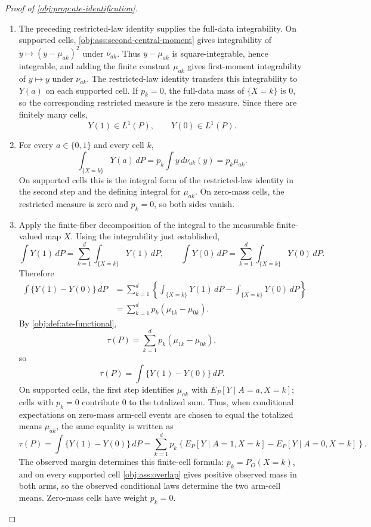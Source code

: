 \begin{proof}[Proof of \cref{obj:prop:ate-identification}]
\begin{enumerate}
\item
The preceding restricted-law identity supplies the full-data integrability.  On supported cells, \cref{obj:ass:second-central-moment} gives integrability of \(y\mapsto (y-\mu_{ak})^2\) under \(\nu_{ak}\).  Thus \(y-\mu_{ak}\) is square-integrable, hence integrable, and adding the finite constant \(\mu_{ak}\) gives first-moment integrability of \(y\mapsto y\) under \(\nu_{ak}\).  The restricted-law identity transfers this integrability to \(Y(a)\) on each supported cell.  If \(p_k=0\), the full-data mass of \(\{X=k\}\) is \(0\), so the corresponding restricted measure is the zero measure.  Since there are finitely many cells,
\[
Y(1)\in L^1(P),\qquad Y(0)\in L^1(P).
\]

\item
For every \(a\in\{0,1\}\) and every cell \(k\),
\[
\int_{\{X=k\}}Y(a)\,dP
=
p_k\int y\,d\nu_{ak}(y)
=
p_k\mu_{ak}.
\]
On supported cells this is the integral form of the restricted-law identity in the second step and the defining integral for \(\mu_{ak}\).  On zero-mass cells, the restricted measure is zero and \(p_k=0\), so both sides vanish. %

\item
Apply the finite-fiber decomposition of the integral to the measurable finite-valued map \(X\).  Using the integrability just established,
\[
\int Y(1)\,dP
=
\sum_{k=1}^{d}\int_{\{X=k\}}Y(1)\,dP,
\qquad
\int Y(0)\,dP
=
\sum_{k=1}^{d}\int_{\{X=k\}}Y(0)\,dP.
\]
Therefore
\[
\begin{aligned}
\int\{Y(1)-Y(0)\}\,dP
&=
\sum_{k=1}^{d}
\left\{
\int_{\{X=k\}}Y(1)\,dP
-
\int_{\{X=k\}}Y(0)\,dP
\right\}\\
&=
\sum_{k=1}^{d}p_k(\mu_{1k}-\mu_{0k}).
\end{aligned}
\]
By \cref{obj:def:ate-functional},
\[
\tau(P)=\sum_{k=1}^{d}p_k(\mu_{1k}-\mu_{0k}),
\]
so
\[
\tau(P)
=
\int\{Y(1)-Y(0)\}\,dP.
\]
On supported cells, the first step identifies \(\mu_{ak}\) with \(E_P[Y\mid A=a,X=k]\); cells with \(p_k=0\) contribute \(0\) to the totalized sum.  Thus, when conditional expectations on zero-mass arm-cell events are chosen to equal the totalized means \(\mu_{ak}\), the same equality is written as
\[
\tau(P)
=
\int\{Y(1)-Y(0)\}\,dP
=
\sum_{k=1}^{d}p_k
\left\{
E_P[Y\mid A=1,X=k]-E_P[Y\mid A=0,X=k]
\right\}.
\]
The observed margin determines this finite-cell formula: \(p_k=P_O(X=k)\), and on every supported cell \cref{obj:ass:overlap} gives positive observed mass in both arms, so the observed conditional laws determine the two arm-cell means.  Zero-mass cells have weight \(p_k=0\). %
\end{enumerate}
\end{proof}
